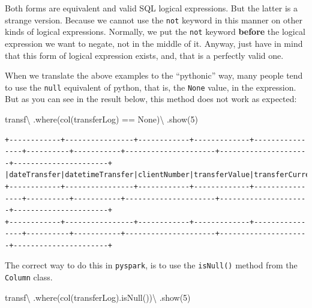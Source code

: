 \documentclass[
  11pt,
  letterpaper,
  DIV=11,
  numbers=noendperiod]{scrreprt}
\newenvironment{Shaded}{\begin{snugshade}}{\end{snugshade}}
\newcommand{\DecValTok}[1]{\textcolor[rgb]{0.68,0.00,0.00}{#1}}
\newcommand{\NormalTok}[1]{\textcolor[rgb]{0.00,0.23,0.31}{#1}}
\newcommand{\OperatorTok}[1]{\textcolor[rgb]{0.37,0.37,0.37}{#1}}
\newcommand{\StringTok}[1]{\textcolor[rgb]{0.13,0.47,0.30}{#1}}
\newcommand{\VariableTok}[1]{\textcolor[rgb]{0.07,0.07,0.07}{#1}}
\begin{document}
Both forms are equivalent and valid SQL logical expressions. But the
latter is a strange version. Because we cannot use the \texttt{not}
keyword in this manner on other kinds of logical expressions. Normally,
we put the \texttt{not} keyword \textbf{before} the logical expression
we want to negate, not in the middle of it. Anyway, just have in mind
that this form of logical expression exists, and, that is a perfectly
valid one.

When we translate the above examples to the ``pythonic'' way, many
people tend to use the \texttt{null} equivalent of python, that is, the
\texttt{None} value, in the expression. But as you can see in the result
below, this method does not work as expected:

\begin{Shaded}
\begin{Highlighting}[]
\NormalTok{transf}\OperatorTok{\textbackslash{}}
\NormalTok{  .where(col(}\StringTok{\textquotesingle{}transferLog\textquotesingle{}}\NormalTok{) }\OperatorTok{==} \VariableTok{None}\NormalTok{)}\OperatorTok{\textbackslash{}}
\NormalTok{  .show(}\DecValTok{5}\NormalTok{)}
\end{Highlighting}
\end{Shaded}

\begin{verbatim}
+------------+----------------+------------+-------------+----------------+----------+-----------+---------------------+---------------------+----------------------+
|dateTransfer|datetimeTransfer|clientNumber|transferValue|transferCurrency|transferID|transferLog|destinationBankNumber|destinationBankBranch|destinationBankAccount|
+------------+----------------+------------+-------------+----------------+----------+-----------+---------------------+---------------------+----------------------+
+------------+----------------+------------+-------------+----------------+----------+-----------+---------------------+---------------------+----------------------+
\end{verbatim}

The correct way to do this in \texttt{pyspark}, is to use the
\texttt{isNull()} method from the \texttt{Column} class.

\begin{Shaded}
\begin{Highlighting}[]
\NormalTok{transf}\OperatorTok{\textbackslash{}}
\NormalTok{  .where(col(}\StringTok{\textquotesingle{}transferLog\textquotesingle{}}\NormalTok{).isNull())}\OperatorTok{\textbackslash{}}
\NormalTok{  .show(}\DecValTok{5}\NormalTok{)}
\end{Highlighting}
\end{Shaded}
\end{document}
